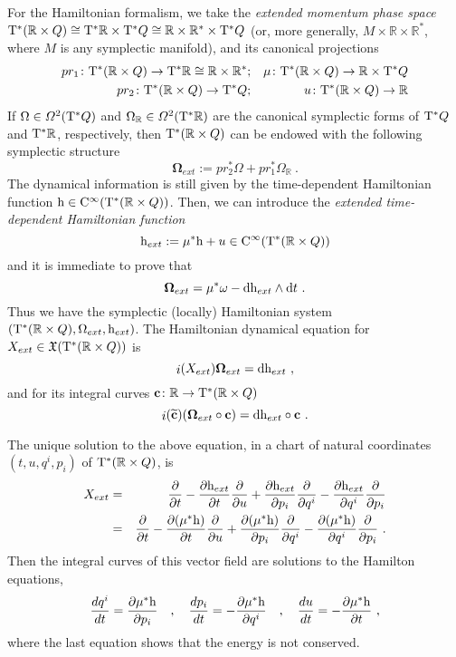 \documentclass[12pt]{report}
\def\beann{\begin{eqnarray*}}
\def\eeann{\end{eqnarray*}}
\def\derpar#1#2{\frac{\partial{#1}}{\partial{#2}}}
\def\vf{\mathfrak X}
\def\df{{\mit\Omega}}
\def\d{{\rm d}}
\def\Real{\mathbb{R}}
\def\Tan{{\rm T}}
\def\inn{\mathop{i}\nolimits}
\def\Cinfty{{\rm C}^\infty}
\begin{document}
For the Hamiltonian formalism, we take the
{\sl extended momentum phase space}
$\Tan^*(\Real \times Q) \cong
 \Tan^*\Real\times\Tan^*Q \cong
 \Real \times \Real^*\times\Tan^*Q$
(or, more generally, $M \times \Real \times \Real^*$,
where $M$ is any symplectic manifold), and its  canonical projections
\beann
pr_1\colon\Tan^*(\Real \times Q)\to\Tan^*\Real \cong\Real \times \Real^*
&;&
\mu\colon \Tan^*(\Real \times Q) \to \Real\times\Tan^*Q
\\
pr_2\colon \Tan^*(\Real \times Q)\to \Tan^*Q
&;&
u\colon\Tan^*(\Real \times Q) \to \Real
\eeann
If $\Omega \in\df^2(\Tan^*Q)$ and $\Omega_{\Real} \in\df^2(\Tan^*\Real )$
are the canonical symplectic forms of $\Tan^*Q$ and $\Tan^*\Real $, respectively,
then $\Tan^*(\Real \times Q)$
can be endowed with the following symplectic structure
$$
{\mathbf \Omega}_{ext} := pr_2^* \Omega +pr_1^* \Omega_{\Real} \ .
$$
The dynamical information is still given by the time-dependent Hamiltonian function
${\rm h} \in \Cinfty(\Tan^*(\Real \times Q))$.
Then, we can introduce the {\sl extended time-dependent Hamiltonian function}
$$
{\rm h}_{ext} := \mu^* {\rm h} + u \in \Cinfty(\Tan^*(\Real \times Q))
$$
and it is immediate to prove that
$$
{\mathbf \Omega}_{ext} = \mu^* \omega - \d{\rm h}_{ext} \wedge\d t \ .
$$
Thus we have the symplectic (locally) Hamiltonian system
$(\Tan^*(\Real \times Q),\Omega_{ext},{\rm h}_{ext})$.
The Hamiltonian dynamical equation for $X_{ext}\in\vf(\Tan^*(\Real \times Q))$ is
$$
\inn(X_{ext}){\mathbf \Omega}_{ext} = \d{\rm h}_{ext}  \ ,
$$
and for its integral curves ${\bf c}\colon\Real\to\Tan^*(\Real\times Q)$ 
$$
\inn(\widetilde{\bf c})({\mathbf \Omega}_{ext}\circ{\bf c}) = \d{\rm h}_{ext}\circ{\bf c}  \ .
$$

The unique solution to the above equation, in a chart of natural coordinates
$(t,u,q^i,p_i)$ of $\Tan^*(\Real \times Q)$, is
\beann
X_{ext}&=&
\derpar{}{t} -
\derpar{{\rm h}_{ext}}{t}\derpar{}{u}+
\derpar{{\rm h}_{ext}}{p_i} \derpar{}{q^i} -
\derpar{{\rm h}_{ext}}{q^i} \derpar{}{p_i}
\\
&=&
\derpar{}{t} -
\derpar{(\mu^*{\rm h})}{t}\derpar{}{u}+
\derpar{(\mu^*{\rm h})}{p_i} \derpar{}{q^i} -
\derpar{(\mu^*{\rm h})}{q^i} \derpar{}{p_i} \ .
\eeann
Then the integral curves of this vector field are solutions to the  Hamilton equations,
$$
\frac{dq^i}{dt} = \derpar{\mu^*{\rm h}}{p_i} \quad ,\quad
\frac{dp_i}{dt} = - \derpar{\mu^*{\rm h}}{q^i} \quad , \quad
\frac{du}{dt} = - \derpar{\mu^*{\rm h}}{t} \ ,
$$
where the last equation shows that the energy is not conserved.
\end{document}
